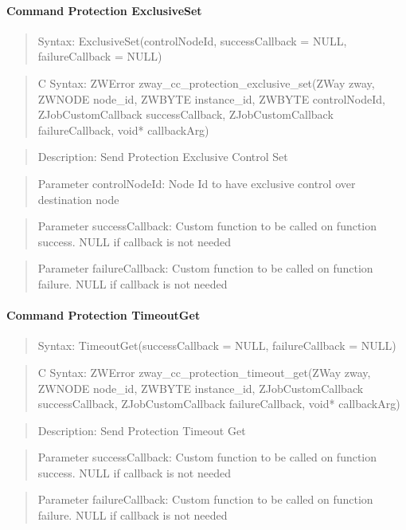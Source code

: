 \paragraph{Command Protection ExclusiveSet}
\begin{quote}Syntax: ExclusiveSet(controlNodeId, successCallback = NULL, failureCallback = NULL)\end{quote}
\begin{quote}C Syntax: ZWError zway\_cc\_protection\_exclusive\_set(ZWay zway, ZWNODE node\_id, ZWBYTE instance\_id, ZWBYTE controlNodeId, ZJobCustomCallback successCallback, ZJobCustomCallback failureCallback, void* callbackArg)\end{quote}
\begin{quote}Description: Send Protection Exclusive Control Set\end{quote}
\begin{quote}Parameter controlNodeId: Node Id to have exclusive control over destination node\end{quote}
\begin{quote}Parameter successCallback: Custom function to be called on function success. NULL if callback is not needed\end{quote}
\begin{quote}Parameter failureCallback: Custom function to be called on function failure. NULL if callback is not needed\end{quote}


\paragraph{Command Protection TimeoutGet}
\begin{quote}Syntax: TimeoutGet(successCallback = NULL, failureCallback = NULL)\end{quote}
\begin{quote}C Syntax: ZWError zway\_cc\_protection\_timeout\_get(ZWay zway, ZWNODE node\_id, ZWBYTE instance\_id, ZJobCustomCallback successCallback, ZJobCustomCallback failureCallback, void* callbackArg)\end{quote}
\begin{quote}Description: Send Protection Timeout Get\end{quote}
\begin{quote}Parameter successCallback: Custom function to be called on function success. NULL if callback is not needed\end{quote}
\begin{quote}Parameter failureCallback: Custom function to be called on function failure. NULL if callback is not needed\end{quote}


